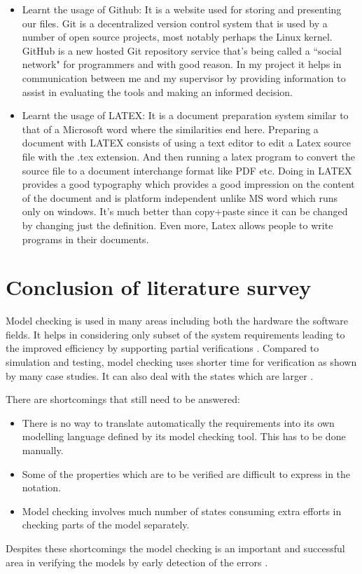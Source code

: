 \documentclass[a4paper,10pt]{report}
\begin{document}
\begin{itemize}
\item Learnt the usage of Github: It is a website used for storing and presenting our files. Git is a decentralized version control system that is used by a number of open source projects, most notably perhaps the Linux kernel. GitHub is a new hosted Git repository service that's being called a ``social network" for programmers and with good reason. In my project it helps in communication between me and my supervisor by providing information to assist in evaluating the tools and making an informed decision.
\item Learnt the usage of LATEX: It is a document preparation system similar to that of a Microsoft word where the similarities end here. Preparing a document with LATEX consists of using a text editor to edit a Latex source file with the .tex extension. And then running a latex program to convert the source file to a document interchange format like PDF etc. Doing in LATEX provides a good typography which provides a good impression on the content of the document and is platform independent unlike MS word which runs only on windows. It's much better than copy+paste since it can be changed by changing just the definition. Even more, Latex allows people to write programs in their documents. 
\end{itemize}

\section{Conclusion of literature survey}
\label{conclude literature survey}

Model checking is used in many areas including both the hardware the software fields. It helps in considering only subset of the system requirements leading to the improved efficiency by supporting partial verifications \cite{Palshikar2004}. Compared to simulation and testing, model checking uses shorter time for verification as shown by many case studies. It can also deal with the states which are larger \cite{Palshikar2004}.

There are shortcomings that still need to be answered:
\begin{itemize}
\item There is no way to translate automatically the requirements into its own modelling language defined by its model checking tool. This has to be done manually.
\item Some of the properties which are to be verified are difficult to express in the notation.
\item Model checking involves much number of states consuming extra efforts in checking parts of the model separately. 
\end{itemize}
Despites these shortcomings the model checking is an important and successful area in verifying the models by early detection of the errors \cite{Havelund}.
\end{document}

